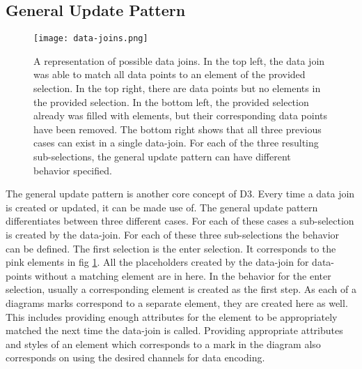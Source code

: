 \subsection{General Update Pattern}



\begin{figure}
    \texttt{[image: data-joins.png]}
    \captionsetup{width=0.9\textwidth}
    \caption[general-update-pattern]{A representation of possible data joins. In the top left, the data join was able to match all data points to an element of the provided selection. In the top right, there are data points but no elements in the provided selection. In the bottom left, the provided selection already was filled with elements, but their corresponding data points have been removed. The bottom right shows that all three previous cases can exist in a single data-join. For each of the three resulting sub-selections, the general update pattern can have different behavior specified.}
    \label{fig:general-update-pattern}
\end{figure}

The general update pattern is another core concept of D3. Every time a data join is created or updated, it can be made use of. The general update pattern differentiates between three different cases. For each of these cases a sub-selection is created by the data-join. For each of these three sub-selections the behavior can be defined. The first selection is the enter selection. It corresponds to the pink elements in fig \ref{fig:general-update-pattern}. All the placeholders created by the data-join for data-points without a matching element are in here. In the behavior for the enter selection, usually a corresponding element is created as the first step. As each of a diagrams marks correspond to a separate element, they are created here as well. This includes providing enough attributes for the element to be appropriately matched the next time the data-join is called. Providing appropriate attributes and styles of an element which corresponds to a mark in the diagram also corresponds on using the desired channels for data encoding.

